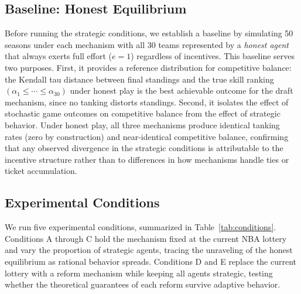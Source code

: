 \subsection{Baseline: Honest Equilibrium}

Before running the strategic conditions, we establish a baseline by simulating
50 seasons under each mechanism with all 30 teams represented by a
\emph{honest agent} that always exerts full effort ($e = 1$) regardless of
incentives.
This baseline serves two purposes.
First, it provides a reference distribution for competitive balance: the
Kendall tau distance between final standings and the true skill ranking
$(\alpha_1 \leq \cdots \leq \alpha_{30})$ under honest play is the best
achievable outcome for the draft mechanism, since no tanking distorts
standings.
Second, it isolates the effect of stochastic game outcomes on competitive
balance from the effect of strategic behavior.
Under honest play, all three mechanisms produce identical tanking rates (zero
by construction) and near-identical competitive balance, confirming that any
observed divergence in the strategic conditions is attributable to the
incentive structure rather than to differences in how mechanisms handle
ties or ticket accumulation.

\subsection{Experimental Conditions}

We run five experimental conditions, summarized in Table~\ref{tab:conditions}.
Conditions A through C hold the mechanism fixed at the current NBA lottery and
vary the proportion of strategic agents, tracing the unraveling of the honest
equilibrium as rational behavior spreads.
Conditions D and E replace the current lottery with a reform mechanism while
keeping all agents strategic, testing whether the theoretical guarantees of
each reform survive adaptive behavior.

